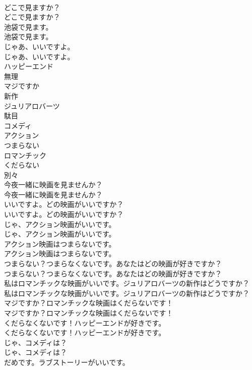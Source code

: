 \documentclass[8pt]{extreport}
\begin{document}
\begin{CJK}{UTF8}{min}
\\	どこで見ますか？	
\\	どこで見ますか？ 
\\	池袋で見ます。	
\\	池袋で見ます。 
\\	じゃあ、いいですよ。	
\\	じゃあ、いいですよ。 
\\	ハッピーエンド
\\	無理
\\	マジですか
\\	新作
\\	ジュリアロバーツ
\\	駄目
\\	コメディ
\\	アクション
\\	つまらない
\\	ロマンチック
\\	くだらない
\\	別々
\\	今夜一緒に映画を見ませんか？	
\\	今夜一緒に映画を見ませんか？ 
\\	いいですよ。どの映画がいいですか？	
\\	いいですよ。どの映画がいいですか？ 
\\	じゃ、アクション映画がいいです。	
\\	じゃ、アクション映画がいいです。 
\\	アクション映画はつまらないです。	
\\	アクション映画はつまらないです。 
\\	つまらない？つまらなくないです。あなたはどの映画が好きですか？	
\\	つまらない？つまらなくないです。あなたはどの映画が好きですか？ 
\\	私はロマンチックな映画がいいです。ジュリアロバーツの新作はどうですか？	
\\	私はロマンチックな映画がいいです。ジュリアロバーツの新作はどうですか？ 
\\	マジですか？ロマンチックな映画はくだらないです！	
\\	マジですか？ロマンチックな映画はくだらないです！ 
\\	くだらなくないです！ハッピーエンドが好きです。	
\\	くだらなくないです！ハッピーエンドが好きです。 
\\	じゃ、コメディは？	
\\	じゃ、コメディは？ 
\\	だめです。ラブストーリーがいいです。	

\end{CJK}
\end{document}
